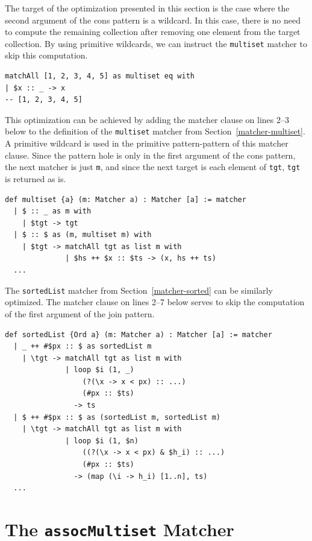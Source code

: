 The target of the optimization presented in this section is the case where the second argument of the cons pattern is a wildcard.
In this case, there is no need to compute the remaining collection after removing one element from the target collection.
By using primitive wildcards, we can instruct the \lstinline{multiset} matcher to skip this computation.
\begin{lstlisting}[language=egison]
matchAll [1, 2, 3, 4, 5] as multiset eq with
| $x :: _ -> x
-- [1, 2, 3, 4, 5]
\end{lstlisting}
This optimization can be achieved by adding the matcher clause on lines 2--3 below to the definition of the \lstinline{multiset} matcher from Section~\ref{matcher-multiset}.
A primitive wildcard is used in the primitive pattern-pattern of this matcher clause.
Since the pattern hole is only in the first argument of the cons pattern, the next matcher is just \lstinline{m}, and since the next target is each element of \lstinline{tgt}, \lstinline{tgt} is returned as is.
\begin{lstlisting}[language=egison]
def multiset {a} (m: Matcher a) : Matcher [a] := matcher
  | $ :: _ as m with
    | $tgt -> tgt
  | $ :: $ as (m, multiset m) with
    | $tgt -> matchAll tgt as list m with
              | $hs ++ $x :: $ts -> (x, hs ++ ts)
  ...
\end{lstlisting}

The \lstinline{sortedList} matcher from Section~\ref{matcher-sorted} can be similarly optimized.
The matcher clause on lines 2--7 below serves to skip the computation of the first argument of the join pattern.
\begin{lstlisting}[language=egison]
def sortedList {Ord a} (m: Matcher a) : Matcher [a] := matcher
  | _ ++ #$px :: $ as sortedList m
    | \tgt -> matchAll tgt as list m with
              | loop $i (1, _)
                  (?(\x -> x < px) :: ...)
                  (#px :: $ts)
                -> ts
  | $ ++ #$px :: $ as (sortedList m, sortedList m)
    | \tgt -> matchAll tgt as list m with
              | loop $i (1, $n)
                  ((?(\x -> x < px) & $h_i) :: ...)
                  (#px :: $ts)
                -> (map (\i -> h_i) [1..n], ts)
  ...
\end{lstlisting}

\section{The \texttt{assocMultiset} Matcher}\label{matcher-assoc}

